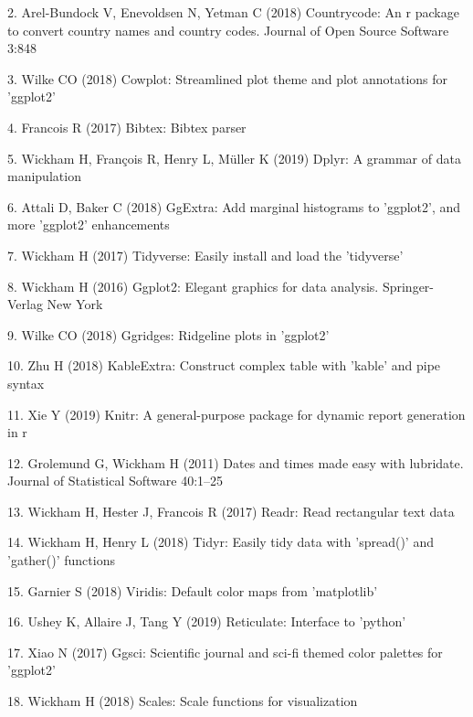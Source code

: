 \documentclass[11pt,]{article}
\begin{document}
\leavevmode\hypertarget{ref-countrycode}{}%
2. Arel-Bundock V, Enevoldsen N, Yetman C (2018) Countrycode: An r
package to convert country names and country codes. Journal of Open
Source Software 3:848

\leavevmode\hypertarget{ref-cowplot}{}%
3. Wilke CO (2018) Cowplot: Streamlined plot theme and plot annotations
for 'ggplot2'

\leavevmode\hypertarget{ref-bibtex}{}%
4. Francois R (2017) Bibtex: Bibtex parser

\leavevmode\hypertarget{ref-dplyr}{}%
5. Wickham H, François R, Henry L, Müller K (2019) Dplyr: A grammar of
data manipulation

\leavevmode\hypertarget{ref-ggExtra}{}%
6. Attali D, Baker C (2018) GgExtra: Add marginal histograms to
'ggplot2', and more 'ggplot2' enhancements

\leavevmode\hypertarget{ref-tidyverse}{}%
7. Wickham H (2017) Tidyverse: Easily install and load the 'tidyverse'

\leavevmode\hypertarget{ref-ggplot2}{}%
8. Wickham H (2016) Ggplot2: Elegant graphics for data analysis.
Springer-Verlag New York

\leavevmode\hypertarget{ref-ggridges}{}%
9. Wilke CO (2018) Ggridges: Ridgeline plots in 'ggplot2'

\leavevmode\hypertarget{ref-kableExtra}{}%
10. Zhu H (2018) KableExtra: Construct complex table with 'kable' and
pipe syntax

\leavevmode\hypertarget{ref-knitr1}{}%
11. Xie Y (2019) Knitr: A general-purpose package for dynamic report
generation in r

\leavevmode\hypertarget{ref-lubridate}{}%
12. Grolemund G, Wickham H (2011) Dates and times made easy with
lubridate. Journal of Statistical Software 40:1--25

\leavevmode\hypertarget{ref-readr}{}%
13. Wickham H, Hester J, Francois R (2017) Readr: Read rectangular text
data

\leavevmode\hypertarget{ref-tidyr}{}%
14. Wickham H, Henry L (2018) Tidyr: Easily tidy data with 'spread()'
and 'gather()' functions

\leavevmode\hypertarget{ref-viridis}{}%
15. Garnier S (2018) Viridis: Default color maps from 'matplotlib'

\leavevmode\hypertarget{ref-reticulate}{}%
16. Ushey K, Allaire J, Tang Y (2019) Reticulate: Interface to 'python'

\leavevmode\hypertarget{ref-ggsci}{}%
17. Xiao N (2017) Ggsci: Scientific journal and sci-fi themed color
palettes for 'ggplot2'

\leavevmode\hypertarget{ref-scales}{}%
18. Wickham H (2018) Scales: Scale functions for visualization
\end{document}
